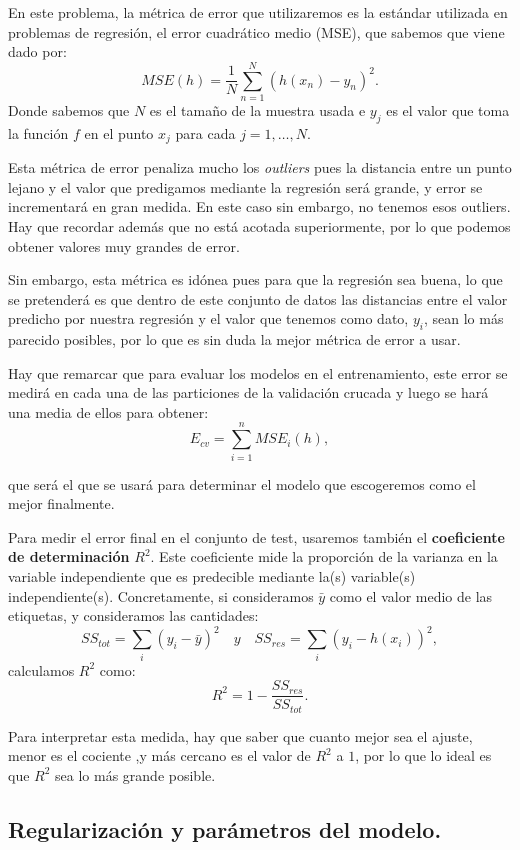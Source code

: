 \documentclass[a4paper, 20pt]{article}
\begin{document}
En este problema, la métrica de error que utilizaremos es la estándar utilizada en problemas de regresión, el error cuadrático medio (MSE), que sabemos que viene dado por:
\[
MSE(h) = \frac{1}{N} \sum_{n = 1}^N (h(x_n) - y_n)^2.
\]
Donde sabemos que $N$ es el tamaño de la muestra usada e $y_j$ es el valor que toma la función $f$ en el punto $x_j$ para cada $j = 1,\dots ,N$. 

Esta métrica de error penaliza mucho los \emph{outliers} pues la distancia entre un punto lejano y el valor que predigamos mediante la regresión será grande, y error se incrementará en gran medida. En este caso sin embargo, no tenemos esos outliers. Hay que recordar además que no está acotada superiormente, por lo que podemos obtener valores muy grandes de error.

Sin embargo, esta métrica es idónea pues para que la regresión sea buena, lo que se pretenderá es que dentro de este conjunto de datos las distancias entre el valor predicho por nuestra regresión y el valor que tenemos como dato, $y_i$, sean lo más parecido posibles, por lo que es sin duda la mejor métrica de error a usar.

Hay que remarcar que para evaluar los modelos en el entrenamiento, este error se medirá en cada una de las particiones de la validación crucada y luego se hará una media de ellos para obtener:
$$
E_{cv} = \sum_{i = 1}^n MSE_i(h),
$$

que será el que se usará para determinar el modelo que escogeremos como el mejor finalmente.

Para medir el error final en el conjunto de test, usaremos también el \textbf{coeficiente de determinación} $R^2$. Este coeficiente mide la proporción de la varianza en la variable independiente que es predecible mediante la(s) variable(s) independiente(s). Concretamente, si consideramos $\bar{y}$ como el valor medio de las etiquetas, y consideramos las cantidades:
\[
SS_{tot} = \sum_i(y_i - \bar{y})^2 \quad y \quad SS_{res} = \sum_i(y_i - h(x_i))^2,
\]
calculamos $R^2$ como:
$$
R^2 =  1 - \frac{SS_{res}}{SS_{tot}}.
$$

Para interpretar esta medida, hay que saber que cuanto mejor sea el ajuste, menor es el cociente ,y más cercano es el valor de $R^2$ a $1$, por lo que lo ideal es que $R^2$ sea lo más grande posible.

\subsection{Regularización y parámetros del modelo.}
\end{document}
